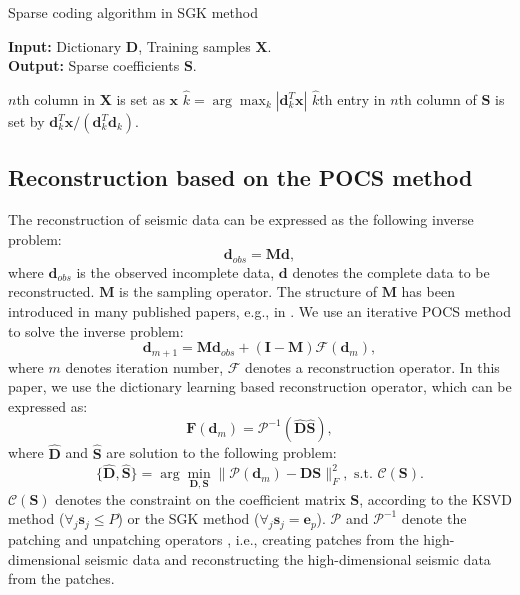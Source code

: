 \begin{algorithm}
   \caption{Sparse coding algorithm in SGK method}
   \textbf{Input:} Dictionary $\mathbf{D}$, Training samples $\mathbf{X}$. \\
   \textbf{Output:} Sparse coefficients $\mathbf{S}$. 
    \begin{algorithmic}[1]
 \State $n$th column in $\mathbf{X}$ is set as $\mathbf{x}$
     \State $\hat{k}  = \displaystyle\arg\max_{k} |\mathbf{d}_k^T\mathbf{x}|$ 
  \State  $\hat{k}$th entry in $n$th column of $\mathbf{S}$ is set by $\mathbf{d}_k^T\mathbf{x}/(\mathbf{d}_k^T\mathbf{d}_k)$.
 \EndFor       
\end{algorithmic}
\label{alg:alg2}
\end{algorithm}




\subsection{Reconstruction based on the POCS method}
The reconstruction of seismic data can be expressed as the following inverse problem:
\begin{equation}
\label{eq:inv}
\mathbf{d}_{obs}= \mathbf{M}\mathbf{d},
\end{equation}
where $\mathbf{d}_{obs}$ is the observed incomplete data, $\mathbf{d}$ denotes the complete data to be reconstructed. $\mathbf{M}$ is the sampling operator. The structure of $\mathbf{M}$ has been introduced in many published papers, e.g., in \cite{mostafa2011}. We use an iterative POCS method to solve the inverse problem:
\begin{equation}
\label{eq:iter}
\mathbf{d}_{m+1} = \mathbf{M}\mathbf{d}_{obs} + (\mathbf{I}-\mathbf{M})\mathcal{F}(\mathbf{d}_m),
\end{equation}
where $m$ denotes iteration number, $\mathcal{F}$ denotes a reconstruction operator. In this paper, we use the dictionary learning based reconstruction operator, which can be expressed as:
\begin{equation}
\label{eq:Fdm}
\mathbf{F}(\mathbf{d}_m) = \mathcal{P}^{-1}(\hat{\mathbf{D}}\hat{\mathbf{S}}),
\end{equation}
where $\hat{\mathbf{D}}$ and $\hat{\mathbf{S}}$ are solution to the following problem:
\begin{equation}
\label{eq:pro}
\{\hat{\mathbf{D}},\hat{\mathbf{S}}\}=\arg\min_{\mathbf{D},\mathbf{S}} \parallel \mathcal{P}(\mathbf{d}_m)-\mathbf{D}\mathbf{S} \parallel_{F}^{2},\,\,\text{s.t.}\,\, \mathcal{C}(\mathbf{S}).
\end{equation}
$\mathcal{C}(\mathbf{S})$ denotes the constraint on the coefficient matrix $\mathbf{S}$, according to the KSVD method ($\forall_{j} \mathbf{s}_j \le P$) or the SGK method ($\forall_{j} \mathbf{s}_j = \mathbf{e}_p$). $\mathcal{P}$ and $\mathcal{P}^{-1}$ denote the patching and unpatching operators \cite{wanghang2020}, i.e., creating patches from the high-dimensional seismic data and reconstructing the high-dimensional seismic data from the patches. 

